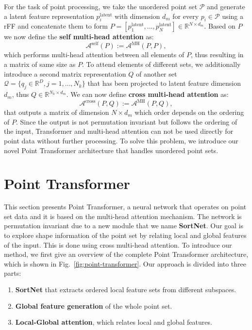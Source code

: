 \documentclass{ieeeaccess}
\begin{document}
For the task of point processing, we take the unordered point set $\mathcal{P}$ and generate a latent feature representation $p_i^{\text{latent}}$ with dimension $d_m$ for every $p_i \in \mathcal{P}$ using a rFF and concatenate them to form $P = [p_1^{\text{latent}}, \dots, p_N^{\text{latent}}] \in \mathbb{R}^{N\times d_m}$. Based on $P$ we now define the \textbf{self multi-head attention} as:
\begin{equation}\label{eq:smal}
    \mathcal{A}^{\text{self}} (P) := \mathcal{A}^{\text{MH}} (P,P),
\end{equation}
which performs multi-head attention between all elements of $P$, thus resulting in a matrix of same size as $P$. To attend elements of different sets, we additionally introduce a second matrix representation $Q$ of another set \mbox{$\mathcal{Q}=\{ q_j \in \mathbb{R}^{D}, j = 1, \dots, N_k\}$} that has been projected to latent feature dimension $d_m$, thus $Q \in \mathbb{R}^{N_k \times d_m}$. We can now define \textbf{cross multi-head attention} as:
\begin{equation}\label{eq:cmal}
    \mathcal{A}^{\text{cross}} (P,Q) := \mathcal{A}^{\text{MH}}(P,Q),
\end{equation}
that outputs a matrix of dimension $N\times d_m$ which order depends on the ordering of $P$. Since the output is not permutation invariant but follows the ordering of the input, Transformer and multi-head attention can not be used directly for point data without further processing. To solve this problem, we introduce our novel Point Transformer architecture that handles unordered point sets. 


\section{Point Transformer}\label{seq:04_transformer}

This section presents Point Transformer, a neural network that operates on point set data and it is based on the multi-head attention mechanism. The network is permutation invariant due to a new module that we name \textbf{SortNet}. Our goal is to explore shape information of the point set by relating local and global features of the input. This is done using cross multi-head attention. To introduce our method, we first give an overview of the complete Point Transformer architecture, which is shown in Fig.~\ref{fig:point-transformer}. Our approach is divided into three parts:

\begin{enumerate}
    \item \textbf{SortNet} that extracts ordered local feature sets from different subspaces.
    \item \textbf{Global feature generation} of the whole point set.
    \item \textbf{Local-Global attention}, which relates local and global features.
\end{enumerate}
\end{document}
